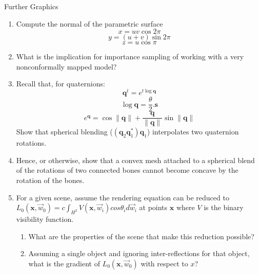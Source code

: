\documentclass{tripos}
\begin{document}
\begin{question}[MockIB,year=2025,paper=2,question=4,author=rrw]{Further Graphics}
  \begin{enumerate}
\item Compute the normal of the parametric surface
  \[
  x = uv\cos2\pi
  \]
  \[
  y = (u+v)\sin 2\pi
  \]
  \[
  z = u\cos \pi
  \]

\item What is the implication for importance sampling of working with a very nonconformally mapped model?
\item Recall that, for quaternions:
  \[
  \mathbf{q}^t = e^{t \log \mathbf{q}}
  \]
  \[
  \log \mathbf{q} = \frac{\theta}{2}.\mathbf{s}
  \]
  \[
  e^{\mathbf{q}} = \cos \|\mathbf{q}\| + \frac{\mathbf{q}}{\|\mathbf{q}\|}\sin \|\mathbf{q}\|
  \]
  Show that spherical blending ($(\mathbf{q}_2\mathbf{q}_1^*)\mathbf{q}_1$) interpolates two quaternion rotations. 

\item Hence, or otherwise, show that a convex mesh attached to a spherical blend of the rotations of two connected bones cannot become concave by the rotation of the bones.

\item For a given scene, assume the rendering equation can be reduced to $L_0(\mathbf{x}, \vec{w}_0) = c \int_{H^2} V(\mathbf{x}, \vec{w}_i)cos \theta_i d\vec{w}_i$ at points $\mathbf{x}$ where $V$ is the binary visibility function.
  \begin{enumerate}
  \item What are the properties of the scene that make this reduction possible? 
  \item Assuming a single object and ignoring inter-reflections for that object, what
    is the gradient of $L_0(\mathbf{x}, \vec{w}_0)$ with respect to $x$? 
  \end{enumerate}
\end{enumerate}

\end{question}
\end{document}
